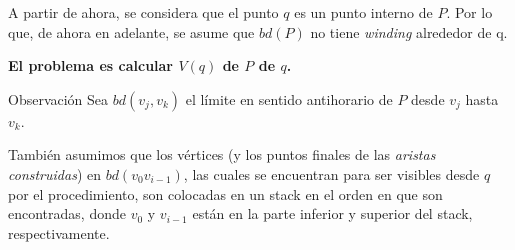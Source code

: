 \documentclass[aspectratio=169,xcolor=dvipsnames, t]{beamer}
\begin{document}

\begin{frame}[c]
  A partir de ahora, se considera que el punto $q$ es un punto interno de $P$. Por lo que, de ahora en adelante, se asume que $bd(P)$ no tiene \textit{winding} alrededor de q.
  \vspace{0.5cm}
  \begin{center}
    \textbf{El problema es calcular $V(q)$ de $P$ de $q$.}
  \end{center}
\end{frame}




\begin{frame}[c]
  \begin{block}{Observación}
    Sea $bd(v_{j}, v_{k})$ el límite en sentido antihorario de $P$ desde $v_{j}$ hasta $v_{k}$.    
  \end{block}
  \vspace{0.5cm}
  También asumimos que los vértices (y los puntos finales de las \textit{aristas construidas}) en $bd(v_{0} v_{i-1})$, las cuales se encuentran para ser visibles desde $q$ por el procedimiento, son colocadas en un stack en el orden en que son encontradas, donde $v_{0}$ y $v_{i-1}$ están en la parte inferior y superior del stack, respectivamente.\\  
\end{frame}

\end{document}

